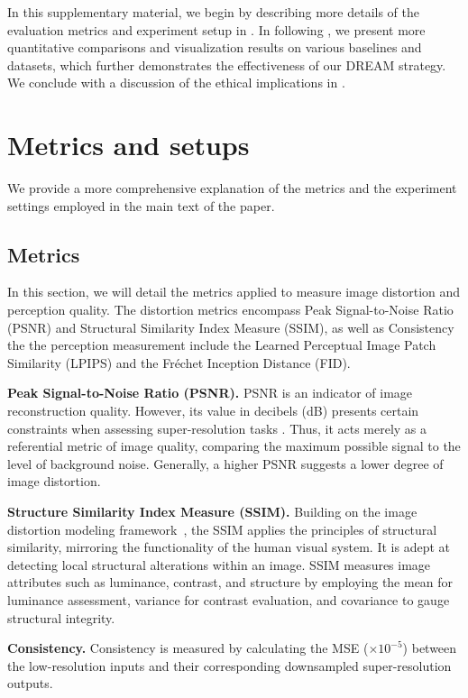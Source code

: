 \clearpage
\setcounter{page}{1}
\maketitlesupplementary
In this supplementary material, we begin by describing more details of the evaluation metrics and experiment setup in . In following , we present more quantitative comparisons and visualization results on various baselines and datasets, which further demonstrates the effectiveness of our DREAM strategy. We conclude with a discussion of the ethical implications in . 

\section{Metrics and setups}
We provide a more comprehensive explanation of the metrics and the experiment settings employed in the main text of the paper.
\label{sec:app-setup}
\subsection{Metrics}
In this section, we will detail the metrics applied to measure image distortion and perception quality. The distortion metrics encompass Peak Signal-to-Noise Ratio (PSNR) and Structural Similarity Index Measure (SSIM), as well as Consistency the the perception measurement include the Learned Perceptual Image Patch Similarity (LPIPS) and the Fréchet Inception Distance (FID).

\textbf{Peak Signal-to-Noise Ratio (PSNR).} PSNR is an indicator of image reconstruction quality. However, its value in decibels (dB) presents certain constraints when assessing super-resolution tasks \cite{menon2020pulse}. Thus, it acts merely as a referential metric of image quality, comparing the maximum possible signal to the level of background noise. Generally, a higher PSNR suggests a lower degree of image distortion.

\textbf{Structure Similarity Index Measure (SSIM).} Building on the image distortion modeling framework~\cite{wang2004image}, the SSIM applies the principles of structural similarity, mirroring the functionality of the human visual system. It is adept at detecting local structural alterations within an image. SSIM measures image attributes such as luminance, contrast, and structure by employing the mean for luminance assessment, variance for contrast evaluation, and covariance to gauge structural integrity.

\textbf{Consistency.} Consistency is measured by calculating the MSE ($\times10^{-5}$) between the low-resolution inputs and their corresponding downsampled super-resolution outputs.

